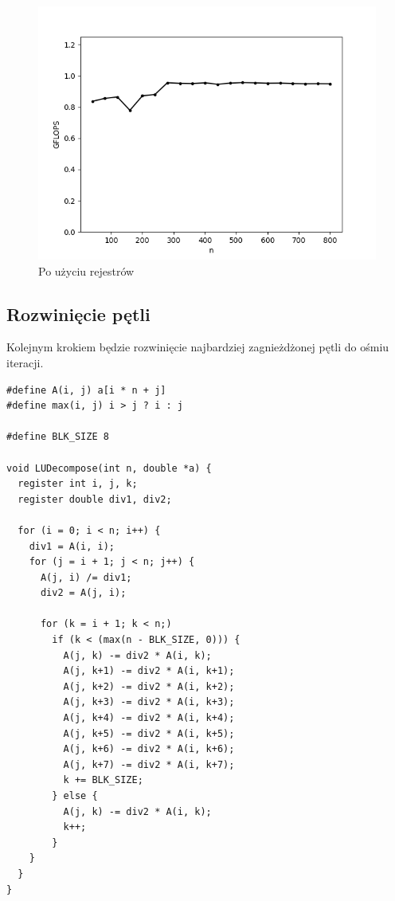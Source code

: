 \documentclass{article}
\begin{document}
\begin{figure}[H]
    \centering
    \includegraphics[width=1.0\textwidth]{figures/fig1.png}
    \caption{Po użyciu rejestrów}
\end{figure}

\subsection{Rozwinięcie pętli}

Kolejnym krokiem będzie rozwinięcie najbardziej zagnieżdżonej pętli do ośmiu iteracji.

\begin{verbatim}
#define A(i, j) a[i * n + j]
#define max(i, j) i > j ? i : j

#define BLK_SIZE 8

void LUDecompose(int n, double *a) {
  register int i, j, k; 
  register double div1, div2;

  for (i = 0; i < n; i++) {
    div1 = A(i, i);
    for (j = i + 1; j < n; j++) {
      A(j, i) /= div1;
      div2 = A(j, i);

      for (k = i + 1; k < n;)
        if (k < (max(n - BLK_SIZE, 0))) {
          A(j, k) -= div2 * A(i, k);
          A(j, k+1) -= div2 * A(i, k+1);
          A(j, k+2) -= div2 * A(i, k+2);
          A(j, k+3) -= div2 * A(i, k+3);
          A(j, k+4) -= div2 * A(i, k+4);
          A(j, k+5) -= div2 * A(i, k+5);
          A(j, k+6) -= div2 * A(i, k+6);
          A(j, k+7) -= div2 * A(i, k+7);
          k += BLK_SIZE;
        } else {
          A(j, k) -= div2 * A(i, k);
          k++;
        }
    }
  }
}
\end{verbatim}
\end{document}
